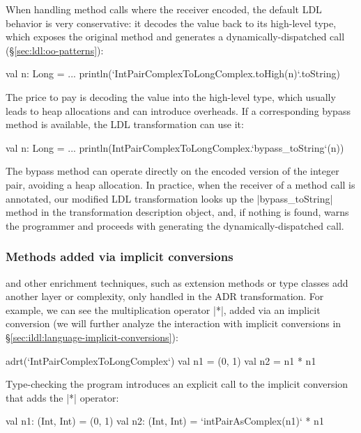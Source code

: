 When handling method calls where the receiver encoded, the default LDL behavior is very conservative: it decodes the value back to its high-level type, which exposes the original method and generates a dynamically-dispatched call (\S\ref{sec:ldl:oo-patterns}):

\begin{lstlisting-nobreak}
val n: Long = ...
println(`IntPairComplexToLongComplex.toHigh(n)`.toString)
\end{lstlisting-nobreak}

The price to pay is decoding the value into the high-level type, which usually leads to heap allocations and can introduce overheads. If a corresponding bypass method is available, the LDL transformation can use it:

\begin{lstlisting-nobreak}
val n: Long = ...
println(IntPairComplexToLongComplex.`bypass_toString`(n))
\end{lstlisting-nobreak}

The bypass method can operate directly on the encoded version of the integer pair, avoiding a heap allocation. In practice, when the receiver of a method call is annotated, our modified LDL transformation looks up the |bypass_toString| method in the transformation description object, and, if nothing is found, warns the programmer and proceeds with generating the dynamically-dispatched call.

\subsubsection{Methods added via implicit conversions} and other enrichment techniques, such as extension methods or type classes add another layer or complexity, only handled in the ADR transformation. For example, we can see the multiplication operator |*|, added via an implicit conversion (we will further analyze the interaction with implicit conversions in \S\ref{sec:ildl:language-implicit-conversions}):

\begin{lstlisting-nobreak}
adrt(`IntPairComplexToLongComplex`) {
  val n1 = (0, 1)
  val n2 = n1 * n1
}
\end{lstlisting-nobreak}

Type-checking the program introduces an explicit call to the implicit conversion that adds the |*| operator:

\begin{lstlisting-nobreak}
val n1: (Int, Int) = (0, 1)
val n2: (Int, Int) = `intPairAsComplex(n1)` * n1
\end{lstlisting-nobreak}

